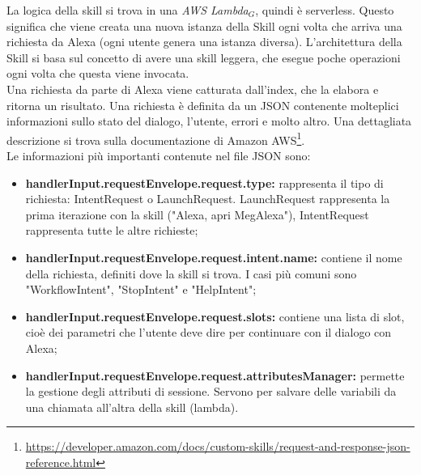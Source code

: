 La logica della skill si trova in una \textit{AWS Lambda$_{G}$}, quindi è serverless. Questo significa che viene creata una nuova istanza della Skill ogni volta che arriva una richiesta da Alexa (ogni utente genera una istanza diversa). L'architettura della Skill si basa sul concetto di avere una skill leggera, che esegue poche operazioni ogni volta che questa viene invocata.\\
Una richiesta da parte di Alexa viene catturata dall'index, che la elabora e ritorna un risultato. Una richiesta è definita da un JSON contenente molteplici informazioni sullo stato del dialogo, l'utente, errori e molto altro. Una dettagliata descrizione si trova sulla documentazione di Amazon AWS\footnote{\url{https://developer.amazon.com/docs/custom-skills/request-and-response-json-reference.html}}.\\
Le informazioni più importanti contenute nel file JSON sono:\label{paramsSkill}
\begin{itemize}
    \item \textbf{handlerInput.requestEnvelope.request.type:} rappresenta il tipo di richiesta: IntentRequest o LaunchRequest. LaunchRequest rappresenta la prima iterazione con la skill ("Alexa, apri MegAlexa"), IntentRequest rappresenta tutte le altre richieste;
    \item \textbf{handlerInput.requestEnvelope.request.intent.name:} contiene il nome della richiesta, definiti dove la skill si trova. I casi più comuni sono "WorkflowIntent", "StopIntent" e "HelpIntent";
    \item \textbf{handlerInput.requestEnvelope.request.slots:} contiene una lista di slot, cioè dei parametri che l'utente deve dire per continuare con il dialogo con Alexa;
    \item \textbf{handlerInput.requestEnvelope.request.attributesManager:} permette la gestione degli attributi di sessione. Servono per salvare delle variabili da una chiamata all'altra della skill (lambda).
\end{itemize}

